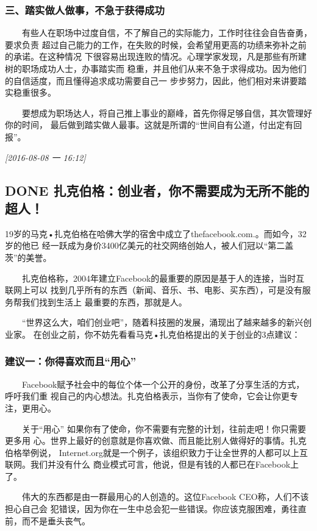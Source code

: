 \documentclass[11pt]{ctexart}
\begin{document}
\subsubsection{三、踏实做人做事，不急于获得成功}
\label{sec:orgheadline50}
　　有些人在职场中过度自信，不了解自己的实际能力，工作时往往会自告奋勇，要求负责
超过自己能力的工作，在失败的时候，会希望用更高的功绩来弥补之前的承诺。在这种情况
下很容易出现连败的情况。心理学家发现，凡是那些有所建树的职场成功人士，办事踏实而
稳重，并且他们从来不急于求得成功。因为他们的自信适度，而且懂得追求成功需要自己一
步步努力，因此，他们相对来讲要踏实稳重很多。


　　要想成为职场达人，将自己推上事业的巅峰，首先你得足够自信，其次管理好你的时间，
最后做到踏实做人最事。这就是所谓的“世间自有公道，付出定有回报”。



\textit{[2016-08-08 一 16:12]}

\subsection{{\bfseries\sffamily DONE} 扎克伯格：创业者，你不需要成为无所不能的超人！}
\label{sec:orgheadline55}
19岁的马克•扎克伯格在哈佛大学的宿舍中成立了thefacebook.com.。而如今，32岁的他已
经一跃成为身价3400亿美元的社交网络创始人，被人们冠以“第二盖茨”的美誉。


　　扎克伯格称，2004年建立Facebook的最重要的原因是基于人的连接，当时互联网上可以
找到几乎所有的东西（新闻、音乐、书、电影、买东西），可是没有服务帮我们找到生活上
最重要的东西，那就是人。


　　“世界这么大，咱们创业吧”，随着科技圈的发展，涌现出了越来越多的新兴创业家。
在创业之前，你不妨先看看马克•扎克伯格提出的关于创业的3点建议：


\subsubsection{建议一：你得喜欢而且“用心”}
\label{sec:orgheadline52}
　　Facebook赋予社会中的每位个体一个公开的身份，改革了分享生活的方式，呼吁我们重
视自己的内心想法。扎克伯格表示，当你有了使命，它会让你更专注，更用心。


　　关于“用心” 如果你有了使命，你不需要有完整的计划，往前走吧！你只需要更多用
心。世界上最好的创意就是你喜欢做、而且能比别人做得好的事情。扎克伯格举例说，
Internet.org就是一个例子，该组织致力于让全世界的人都可以上互联网。我们并没有什么
商业模式可言，他说，但是有钱的人都已在Facebook上了。


　　伟大的东西都是由一群最用心的人创造的。这位Facebook CEO称，人们不该担心自己会
犯错误，因为你在一生中总会犯一些错误。你应该克服困难，勇往直前，而不是垂头丧气。
\end{document}
